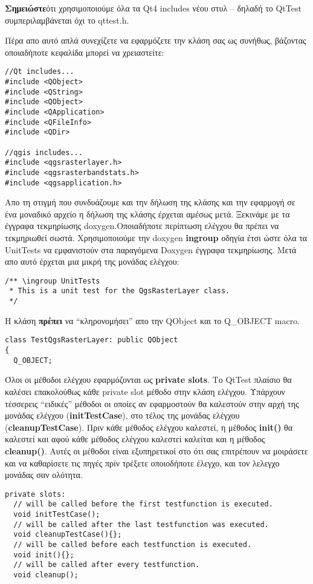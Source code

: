 \textbf{Σημειώστε}ότι χρησιμοποιούμε όλα τα  Qt4 includes 
νέου στυλ – δηλαδή το QtTest συμπεριλαμβάνεται όχι το qttest.h.

Πέρα απο αυτό απλά συνεχίζετε να εφαρμόζετε την κλάση σας ως συνήθως, βάζοντας οποιαδήποτε κεφαλίδα μπορεί να χρειαστείτε:

\begin{verbatim}
//Qt includes...
#include <QObject>
#include <QString>
#include <QObject>
#include <QApplication>
#include <QFileInfo>
#include <QDir>

//qgis includes...
#include <qgsrasterlayer.h> 
#include <qgsrasterbandstats.h> 
#include <qgsapplication.h>
\end{verbatim}

Απο τη στιγμή που συνδυάζουμε και την δήλωση της κλάσης και την εφαρμογή σε ένα μοναδικό αρχείο η δήλωση της κλάσης έρχεται αμέσως μετά. Ξεκινάμε με τα έγγραφα τεκμηρίωσης  doxygen.Οποιαδήποτε περίπτωση ελέγχου θα πρέπει να τεκμηριωθεί σωστά. Χρησιμοποιούμε την doxygen \textbf{ingroup}
οδηγία έτσι ώστε όλα τα UnitTests να εμφανιστούν στα παραγόμενα Doxygen έγγραφα τεκμηρίωσης. Μετά απο αυτό έρχεται μια μικρή της μονάδας ελέγχου:

\begin{verbatim}
/** \ingroup UnitTests
 * This is a unit test for the QgsRasterLayer class.
 */
\end{verbatim}

Η κλάση \textbf{πρέπει} να “κληρονομήσει” απο την QΟbject και το Q\_OBJECT macro.

\begin{verbatim}
class TestQgsRasterLayer: public QObject
{
  Q_OBJECT;
\end{verbatim}

Όλοι οι μέθοδοι ελέγχου εφαρμόζονται ως \textbf{private slots}. Το QtTest πλαίσιο θα καλέσει επακολούθως κάθε private slot μέθοδο στην κλάση ελέγχου. Υπάρχουν τέσσερεις “ειδικές” μέθοδοι οι οποίες αν εφαρμοστούν θα καλεστούν στην αρχή της μονάδας ελέγχου (\textbf{initTestCase}), στο τέλος της μονάδας ελέγχου (\textbf{cleanupTestCase}). Πριν κάθε μέθοδος ελέγχου καλεστεί, η μέθοδος \textbf{init()}
θα καλεστεί  και αφού κάθε μέθοδος ελέγχου καλεστεί καλείται και η μέθοδος \textbf{cleanup()}. Αυτές οι μέθοδοι είναι εξυπηρετικοί στο ότι σας επιτρέπουν να μοιράσετε και να καθαρίσετε τις πηγές πρίν τρέξετε οποιοδήποτε έλεγχο, και τον λελεγχο μονάδας σαν ολότητα. 

\begin{verbatim}
private slots:
  // will be called before the first testfunction is executed.
  void initTestCase();
  // will be called after the last testfunction was executed.
  void cleanupTestCase(){};
  // will be called before each testfunction is executed.
  void init(){};
  // will be called after every testfunction.
  void cleanup();
\end{verbatim}

